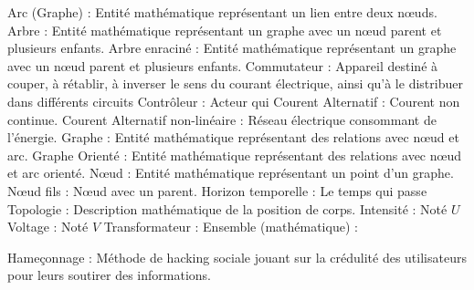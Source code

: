 Arc (Graphe) : Entité mathématique représentant un lien entre deux nœuds.
Arbre : Entité mathématique représentant un graphe avec un nœud parent et plusieurs enfants.
Arbre enraciné : Entité mathématique représentant un graphe avec un nœud parent et plusieurs enfants.
Commutateur : Appareil destiné à couper, à rétablir, à inverser le sens du courant électrique, ainsi qu'à le distribuer dans différents circuits
Contrôleur : Acteur qui
Courent Alternatif : Courent non continue.
Courent Alternatif non-linéaire : Réseau électrique consommant de l'énergie.
Graphe : Entité mathématique représentant des relations avec nœud et arc.
Graphe Orienté : Entité mathématique représentant des relations avec nœud et arc orienté.
Nœud : Entité mathématique représentant un point d'un graphe.
Nœud fils : Nœud avec un parent.
Horizon temporelle : Le temps qui passe
Topologie : Description mathématique de la position de corps.
Intensité : Noté $U$
Voltage : Noté $V$
Transformateur :
Ensemble (mathématique) :

Hameçonnage : Méthode de hacking sociale jouant sur la crédulité des utilisateurs pour leurs soutirer des informations.